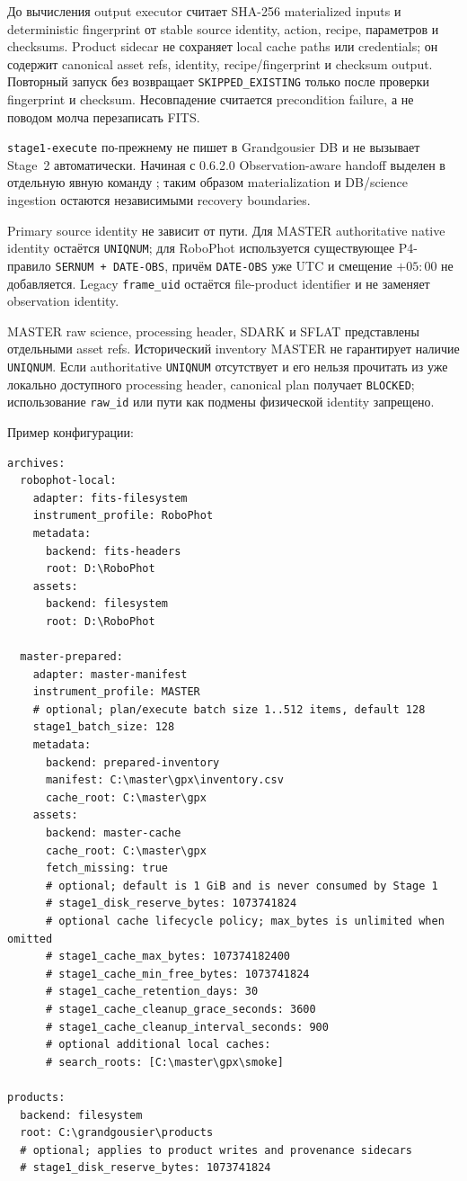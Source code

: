 До вычисления output executor считает SHA-256 materialized inputs и deterministic fingerprint от stable source identity, action, recipe, параметров и checksums. Product sidecar не сохраняет local cache paths или credentials; он содержит canonical asset refs, identity, recipe/fingerprint и checksum output. Повторный запуск без  возвращает \texttt{SKIPPED\_EXISTING} только после проверки fingerprint и checksum. Несовпадение считается precondition failure, а не поводом молча перезаписать FITS.

\texttt{stage1-execute} по-прежнему не пишет в Grandgousier DB и не вызывает Stage~2 автоматически. Начиная с 0.6.2.0 Observation-aware handoff выделен в отдельную явную команду ; таким образом materialization и DB/science ingestion остаются независимыми recovery boundaries.

Primary source identity не зависит от пути. Для MASTER authoritative native identity остаётся \texttt{UNIQNUM}; для RoboPhot используется существующее P4-правило \texttt{SERNUM + DATE-OBS}, причём \texttt{DATE-OBS} уже UTC и смещение $+05{:}00$ не добавляется. Legacy \texttt{frame\_uid} остаётся file-product identifier и не заменяет observation identity.

MASTER raw science, processing header, SDARK и SFLAT представлены отдельными asset refs. Исторический inventory MASTER не гарантирует наличие \texttt{UNIQNUM}. Если authoritative \texttt{UNIQNUM} отсутствует и его нельзя прочитать из уже локально доступного processing header, canonical plan получает \texttt{BLOCKED}; использование \texttt{raw\_id} или пути как подмены физической identity запрещено.

Пример конфигурации:

\begin{lstlisting}
archives:
  robophot-local:
    adapter: fits-filesystem
    instrument_profile: RoboPhot
    metadata:
      backend: fits-headers
      root: D:\RoboPhot
    assets:
      backend: filesystem
      root: D:\RoboPhot

  master-prepared:
    adapter: master-manifest
    instrument_profile: MASTER
    # optional; plan/execute batch size 1..512 items, default 128
    stage1_batch_size: 128
    metadata:
      backend: prepared-inventory
      manifest: C:\master\gpx\inventory.csv
      cache_root: C:\master\gpx
    assets:
      backend: master-cache
      cache_root: C:\master\gpx
      fetch_missing: true
      # optional; default is 1 GiB and is never consumed by Stage 1
      # stage1_disk_reserve_bytes: 1073741824
      # optional cache lifecycle policy; max_bytes is unlimited when omitted
      # stage1_cache_max_bytes: 107374182400
      # stage1_cache_min_free_bytes: 1073741824
      # stage1_cache_retention_days: 30
      # stage1_cache_cleanup_grace_seconds: 3600
      # stage1_cache_cleanup_interval_seconds: 900
      # optional additional local caches:
      # search_roots: [C:\master\gpx\smoke]

products:
  backend: filesystem
  root: C:\grandgousier\products
  # optional; applies to product writes and provenance sidecars
  # stage1_disk_reserve_bytes: 1073741824
\end{lstlisting}

